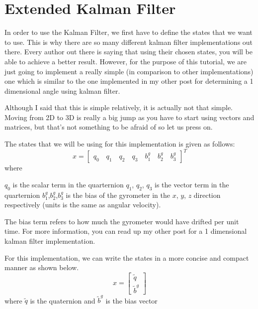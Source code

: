 \documentclass[a4paper,12pt]{book}
\begin{document}
\chapter{Extended Kalman Filter}\label{chapter:EKF}



In order to use the Kalman Filter, we first have to define the states that we want to use. This is why there are so many different kalman filter implementations out there. Every author out there is saying that using their chosen states, you will be able to achieve a better result. However, for the purpose of this tutorial, we are just going to implement a really simple (in comparison to other implementations) one which is similar to the one implemented in my other post for determining a 1 dimensional angle using kalman filter.

Although I said that this is simple relatively, it is actually not that simple. Moving from 2D to 3D is really a big jump as you have to start using vectors and matrices, but that’s not something to be afraid of so let us press on.

The states that we will be using for this implementation is given as follows:
\begin{equation}
    x = \begin{bmatrix} q_0\quad q_1 \quad q_2 \quad q_3 \quad b^g_1 \quad b^g_2 \quad b^g_3 \end{bmatrix}^T
\end{equation}
where

$q_0$ is the scalar term in the quarternion
$q_1$, $q_2$, $q_3$ is the vector term in the quarternion
$b^g_1$,$b^g_2$,$b^g_3$ is the bias of the gyrometer in the $x$, $y$, $z$ direction respectively (units is the same as angular velocity).

The bias term refers to how much the gyrometer would have drifted per unit time. For more information, you can read up my other post for a 1 dimensional kalman filter implementation.

For this implementation, we can write the states in a more concise and compact manner as shown below.
\begin{equation}
    x = \begin{bmatrix} \tilde{q} \\ \tilde{b}^g \end{bmatrix}
\end{equation}
where $\tilde{q}$ is the quaternion and $\tilde{b}^g$ is the bias vector
\end{document}

